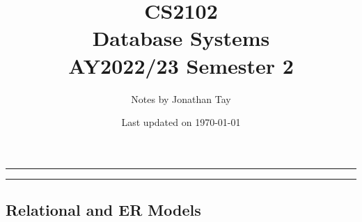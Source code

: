 \documentclass{article}
\title{\vspace{-1cm}\textbf{CS2102 \\[0.25em] Database Systems} \\[2em] \Large AY2022/23 Semester 2 \\[1em]}
\author{Notes by Jonathan Tay}
\date{Last updated on \today}
\newcommand{\pageline}[1]{\par\noindent\rule{\textwidth}{#1}} %
\begin{document}
\linespread{1.4}\selectfont
{} %
\maketitle
\pageline{1.5pt}
\tableofcontents
\pageline{1.5pt}
\linespread{1.1}\selectfont

\newpage
{} %
\begin{multicols*}{2}
    \part{Relational and ER Models}
    
    
    
    
\end{multicols*}
\end{document}
